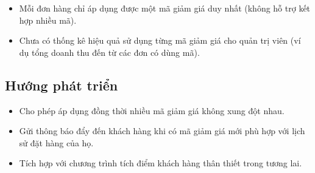 \documentclass[12pt,a4paper]{article}
\begin{document}
\begin{itemize}[leftmargin=*]
    \item Mỗi đơn hàng chỉ áp dụng được một mã giảm giá duy nhất (không hỗ trợ kết hợp nhiều mã).
    \item Chưa có thống kê hiệu quả sử dụng từng mã giảm giá cho quản trị viên (ví dụ tổng doanh thu đến từ các đơn có dùng mã).
\end{itemize}

\subsection{Hướng phát triển}

\begin{itemize}[leftmargin=*]
    \item Cho phép áp dụng đồng thời nhiều mã giảm giá không xung đột nhau.
    \item Gửi thông báo đẩy đến khách hàng khi có mã giảm giá mới phù hợp với lịch sử đặt hàng của họ.
    \item Tích hợp với chương trình tích điểm khách hàng thân thiết trong tương lai.
\end{itemize}
\end{document}
